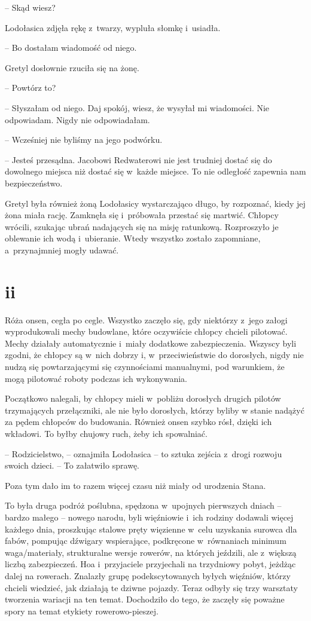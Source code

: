 \documentclass[oneside,polish,11pt,sfheadings]{mwbk}
\begin{document}
-- Skąd wiesz?

Lodołasica zdjęła rękę z~twarzy, wypluła słomkę i~usiadła. 

-- Bo dostałam
wiadomość od niego.

Gretyl dosłownie rzuciła się na żonę. 

-- Powtórz to?

-- Słyszałam od niego. Daj spokój, wiesz, że wysyłał mi wiadomości. Nie
odpowiadam. Nigdy nie odpowiadałam.

-- Wcześniej nie byliśmy na jego podwórku.

-- Jesteś przesądna. Jacobowi Redwaterowi nie jest trudniej dostać się do
dowolnego miejsca niż dostać się w~każde miejsce. To nie odległość
zapewnia nam bezpieczeństwo.

Gretyl była również żoną Lodołasicy wystarczająco długo, by rozpoznać,
kiedy jej żona miała rację. Zamknęła się i~próbowała przestać się
martwić. Chłopcy wrócili, szukając ubrań nadających się na misję
ratunkową. Rozproszyło je oblewanie ich wodą i~ubieranie. Wtedy wszystko
zostało zapomniane, a~przynajmniej mogły udawać.

\chapter*{ii}

Róża onsen, cegła po cegle. Wszystko zaczęło się, gdy niektórzy z~jego
załogi wyprodukowali mechy budowlane, które oczywiście chłopcy chcieli
pilotować. Mechy działały automatycznie i~miały dodatkowe
zabezpieczenia. Wszyscy byli zgodni, że chłopcy są w~nich dobrzy i, w~przeciwieństwie do dorosłych, nigdy nie nudzą się powtarzającymi się
czynnościami manualnymi, pod warunkiem, że mogą pilotować roboty podczas
ich wykonywania.

Początkowo nalegali, by chłopcy mieli w~pobliżu dorosłych drugich
pilotów trzymających przełączniki, ale nie było dorosłych, którzy byliby
w stanie nadążyć za pędem chłopców do budowania. Również onsen szybko
rósł, dzięki ich wkładowi. To byłby chujowy ruch, żeby ich spowalniać.

-- Rodzicielstwo, -- oznajmiła Lodołasica -- to sztuka zejścia z~drogi
rozwoju swoich dzieci. -- To załatwiło sprawę.

Poza tym dało im to razem więcej czasu niż miały od urodzenia Stana.

To była druga podróż poślubna, spędzona w~upojnych pierwszych dniach -- bardzo małego -- nowego narodu, byli więźniowie i~ich rodziny dodawali
więcej każdego dnia, proszkując stalowe pręty więzienne w~celu uzyskania
surowca dla fabów, pompując dźwigary wspierające, podkręcone w~równaniach minimum waga/materiały, strukturalne wersje rowerów, na
których jeździli, ale z~większą liczbą zabezpieczeń. Hoa i~przyjaciele
przyjechali na trzydniowy pobyt, jeżdżąc dalej na rowerach. Znalazły
grupę podekscytowanych byłych więźniów, którzy chcieli wiedzieć, jak
działają te dziwne pojazdy. Teraz odbyły się trzy warsztaty tworzenia
wariacji na ten temat. Dochodziło do tego, że zaczęły się poważne spory
na temat etykiety rowerowo-pieszej.
\end{document}
